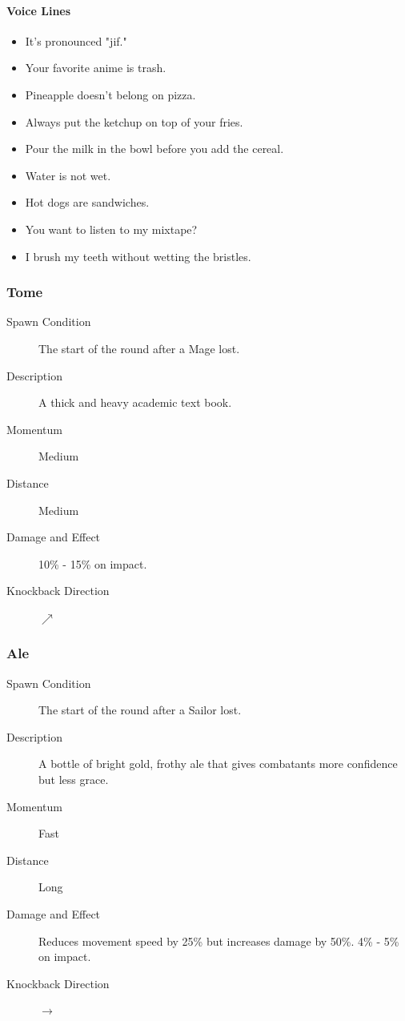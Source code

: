 \paragraph{Voice Lines}

\begin{itemize}
    \item It's pronounced "jif."
    \item Your favorite anime is trash.
    \item Pineapple doesn't belong on pizza.
    \item Always put the ketchup on top of your fries.
    \item Pour the milk in the bowl before you add the cereal.
    \item Water is not wet.
    \item Hot dogs are sandwiches.
    \item You want to listen to my mixtape?
    \item I brush my teeth without wetting the bristles.
\end{itemize}

\noindent\hrulefill

\subsubsection{Tome}

\begin{description}
    \item[Spawn Condition] The start of the round after a Mage lost.
    \item[Description] A thick and heavy academic text book.
    \item[Momentum] Medium
    \item[Distance] Medium
    \item[Damage and Effect] 10\% - 15\% on impact.
    \item[Knockback Direction] $\nearrow$
\end{description}

\noindent\hrulefill

\subsubsection{Ale}

\begin{description}
    \item[Spawn Condition] The start of the round after a Sailor lost.
    \item[Description] A bottle of bright gold, frothy ale that gives combatants more confidence but less grace.
    \item[Momentum] Fast
    \item[Distance] Long
    \item[Damage and Effect] Reduces movement speed by 25\% but increases damage by 50\%. 4\% - 5\% on impact.
    \item[Knockback Direction] $\rightarrow$
\end{description}

